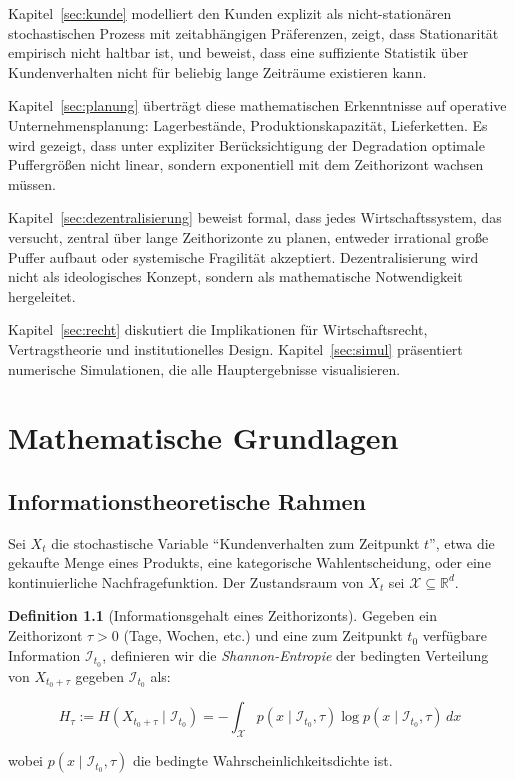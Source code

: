 \documentclass[12pt, a4paper, titlepage]{report}
\theoremstyle{definition}
\newtheorem{definition}[theorem]{Definition}
\theoremstyle{remark}
\newcommand{\R}{\mathbb{R}}
\begin{document}
Kapitel~\ref{sec:kunde} modelliert den Kunden explizit als nicht-stationären stochastischen Prozess mit zeitabhängigen Präferenzen, zeigt, dass Stationarität empirisch nicht haltbar ist, und beweist, dass eine suffiziente Statistik über Kundenverhalten nicht für beliebig lange Zeiträume existieren kann.

Kapitel~\ref{sec:planung} überträgt diese mathematischen Erkenntnisse auf operative Unternehmensplanung: Lagerbestände, Produktionskapazität, Lieferketten. Es wird gezeigt, dass unter expliziter Berücksichtigung der Degradation optimale Puffergrößen nicht linear, sondern exponentiell mit dem Zeithorizont wachsen müssen.

Kapitel~\ref{sec:dezentralisierung} beweist formal, dass jedes Wirtschaftssystem, das versucht, zentral über lange Zeithorizonte zu planen, entweder irrational große Puffer aufbaut oder systemische Fragilität akzeptiert. Dezentralisierung wird nicht als ideologisches Konzept, sondern als mathematische Notwendigkeit hergeleitet.

Kapitel~\ref{sec:recht} diskutiert die Implikationen für Wirtschaftsrecht, Vertragstheorie und institutionelles Design. Kapitel~\ref{sec:simul} präsentiert numerische Simulationen, die alle Hauptergebnisse visualisieren.

\chapter{Mathematische Grundlagen}
\label{sec:grundlagen}

\section{Informationstheoretische Rahmen}

Sei $X_t$ die stochastische Variable ``Kundenverhalten zum Zeitpunkt $t$'', etwa die gekaufte Menge eines Produkts, eine kategorische Wahlentscheidung, oder eine kontinuierliche Nachfragefunktion. Der Zustandsraum von $X_t$ sei $\mathcal{X} \subseteq \R^d$.

\begin{definition}[Informationsgehalt eines Zeithorizonts]
Gegeben ein Zeithorizont $\tau > 0$ (Tage, Wochen, etc.) und eine zum Zeitpunkt $t_0$ verfügbare Information $\mathcal{I}_{t_0}$, definieren wir die \emph{Shannon-Entropie} der bedingten Verteilung von $X_{t_0+\tau}$ gegeben $\mathcal{I}_{t_0}$ als:

\begin{equation}
H_\tau := H(X_{t_0+\tau} \mid \mathcal{I}_{t_0}) = -\int_{\mathcal{X}} p(x \mid \mathcal{I}_{t_0}, \tau) \log p(x \mid \mathcal{I}_{t_0}, \tau) \, dx
\label{eq:entropy}
\end{equation}

wobei $p(x \mid \mathcal{I}_{t_0}, \tau)$ die bedingte Wahrscheinlichkeitsdichte ist.
\end{definition}
\end{document}
